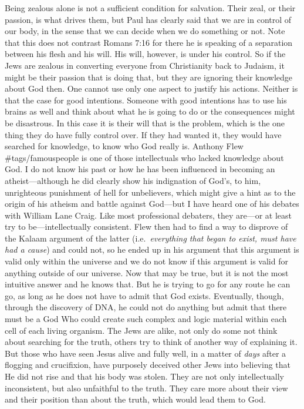 Being zealous alone is not a sufficient condition for salvation. Their
zeal, or their passion, is what drives them, but Paul has clearly said
that we are in control of our body, in the sense that we can decide when
we do something or not. Note that this does not contrast Romans 7:16 for
there he is speaking of a separation between his flesh and his will. His
will, however, is under his control. So if the Jews are zealous in
converting everyone from Christianity back to Judaism, it might be their
passion that is doing that, but they are ignoring their knowledge about
God then. One cannot use only one aspect to justify his actions. Neither
is that the case for good intentions. Someone with good intentions has
to use his brains as well and think about what he is going to do or the
consequences might be disastrous. In this case it is their will that is
the problem, which is the one thing they do have fully control over. If
they had wanted it, they would have searched for knowledge, to know who
God really is. Anthony Flew \#tags/famouspeople is one of those
intellectuals who lacked knowledge about God. I do not know his past or
how he has been influenced in becoming an atheist---although he did
clearly show his indignation of God's, to him, unrighteous punishment of
hell for unbelievers, which might give a hint as to the origin of his
atheism and battle against God---but I have heard one of his debates
with William Lane Craig. Like most professional debaters, they are---or
at least try to be---intellectually consistent. Flew then had to find a
way to disprove of the Kalaam argument of the latter
(i.e.~\emph{everything that began to exist, must have had a cause}) and
could not, so he ended up in his argument that this argument is valid
only within the universe and we do not know if this argument is valid
for anything outside of our universe. Now that may be true, but it is
not the most intuitive answer and he knows that. But he is trying to go
for any route he can go, as long as he does not have to admit that God
exists. Eventually, though, through the discovery of DNA, he could not
do anything but admit that there must be a God Who could create such
complex and logic material within each cell of each living organism. The
Jews are alike, not only do some not think about searching for the
truth, others try to think of another way of explaining it. But those
who have seen Jesus alive and fully well, in a matter of \emph{days}
after a flogging and crucifixion, have purposely deceived other Jews
into believing that He did not rise and that his body was stolen. They
are not only intellectually inconsistent, but also unfaithful to the
truth. They care more about their view and their position than about the
truth, which would lead them to God.

